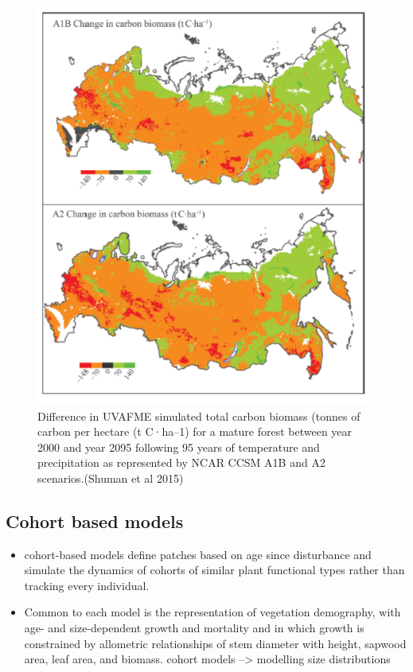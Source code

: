 \documentclass[12pt,oneside]{book}
\providecommand{\tightlist}{%
  \setlength{\itemsep}{0pt}\setlength{\parskip}{0pt}}
\begin{document}
\begin{figure}

{\centering \includegraphics[width=0.8\linewidth]{figures/chap6/f614_uvafme_russia} 

}

\caption{Difference in UVAFME simulated total carbon biomass (tonnes of carbon per hectare (t C·ha–1) for a mature forest between year 2000 and year 2095 following 95 years of temperature and precipitation as represented by NCAR CCSM A1B and A2 scenarios.(Shuman et al 2015)}\label{fig:f614}
\end{figure}

\subsection{Cohort based models}\label{cohort-based-models}

\begin{itemize}
\tightlist
\item
  cohort-based models define patches based on age since disturbance and
  simulate the dynamics of cohorts of similar plant functional types
  rather than tracking every individual.
\item
  Common to each model is the representation of vegetation demography,
  with age- and size-dependent growth and mortality and in which growth
  is constrained by allometric relationships of stem diameter with
  height, sapwood area, leaf area, and biomass. cohort models
  --\textgreater{} modelling size distributions
\end{itemize}
\end{document}
